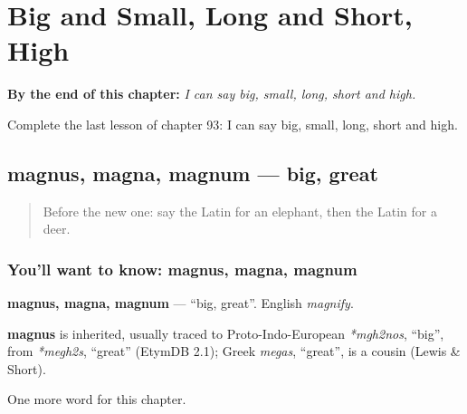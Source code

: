 
\chapter{Big and Small, Long and Short, High}
\label{ch:la-big-and-small-long-and-short-high}

\begin{chapteropening}
\textbf{By the end of this chapter:} \emph{I can say big, small, long, short and high.}

Complete the last lesson of chapter 93: I can say big, small, long, short and high.
\end{chapteropening}

\section[magnus, magna, magnum]{magnus, magna, magnum — big, great}

\label{lesson:LA-C93-magnus}



\begin{quote}
Before the new one: say the Latin for an elephant, then the Latin for a deer.
\end{quote}

\subsection*{You'll want to know: magnus, magna, magnum}
\textbf{magnus, magna, magnum} — \textquotedblleft{}big, great\textquotedblright{}. English \emph{magnify}.

\begin{cousinweb}
\textbf{magnus} is inherited, usually traced to Proto-Indo-European \emph{*mgh2nos}, \textquotedblleft{}big\textquotedblright{}, from \emph{*megh2s}, \textquotedblleft{}great\textquotedblright{} (EtymDB 2.1); Greek \emph{megas}, \textquotedblleft{}great\textquotedblright{}, is a cousin (Lewis \& Short).
\end{cousinweb}

\begin{grammarlens}[title={What you've built}]
One more word for this chapter.
\end{grammarlens}

